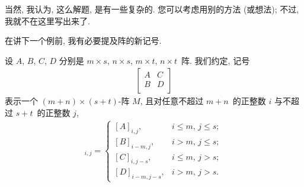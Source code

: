 \documentclass[%
    UTF8,%
    fontset=none,%
    punct=kaiming,%
    zihao=-4,%
    a4paper,%
    oneside,%
]{ctexbook}
\renewcommand*{\leq}{\leqslant}
\begin{document}
当然, 我认为, 这么解题, 是有一些复杂的.
您可以考虑用别的方法 (或想法);
不过, 我就不在这里写出来了.

\vspace{2ex}

在讲下一个例前,
我有必要提及阵的新记号.

\begin{definition}
    设 \(A\), \(B\), \(C\), \(D\)
    分别是 \(m \times s\), \(n \times s\),
    \(m \times t\), \(n \times t\)~阵.
    我们约定, 记号
    \begin{align*}
        \begin{bmatrix}
            A & C \\
            B & D \\
        \end{bmatrix}
    \end{align*}
    表示一个 \((m + n) \times (s + t)\)-阵 \(M\),
    且对任意不超过 \(m + n\)~的正整数 \(i\)
    与不超过 \(s + t\)~的正整数 \(j\),
    \begin{align*}
        [M]_{i,j}
        = \begin{cases}
              [A]_{i,j},
               & \text{\(i \leq m\), \(j \leq s\)}; \\
              [B]_{i-m,j},
               & \text{\(i > m\), \(j \leq s\)};    \\
              [C]_{i,j-s},
               & \text{\(i \leq m\), \(j > s\)};    \\
              [D]_{i-m,j-s},
               & \text{\(i > m\), \(j > s\)}.
          \end{cases}
    \end{align*}
\end{definition}
\end{document}
